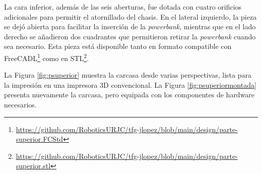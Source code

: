 La cara inferior, además de las seis aberturas, fue dotada con cuatro orificios adicionales para permitir el atornillado del chasis. En el lateral izquierdo, la pieza se dejó abierta para facilitar la inserción de la \textit{powerbank}, mientras que en el lado derecho se añadieron dos cuadrantes que permitieron retirar la \textit{powerbank} cuando sea necesario. Esta pieza está disponible tanto en formato compatible con FreeCADL\footnote{\url{https://github.com/RoboticsURJC/tfg-jlopez/blob/main/design/parte-superior.FCStd}} como en STL\footnote{\url{https://github.com/RoboticsURJC/tfg-jlopez/blob/main/design/parte-superior.stl}}.

La Figura \ref{fig:psuperior} muestra la carcasa desde varias perspectivas, lista para la impresión en una impresora 3D convencional. La Figura \ref{fig:psuperiormontada} presenta nuevamente la carcasa, pero equipada con los componentes de hardware necesarios.



